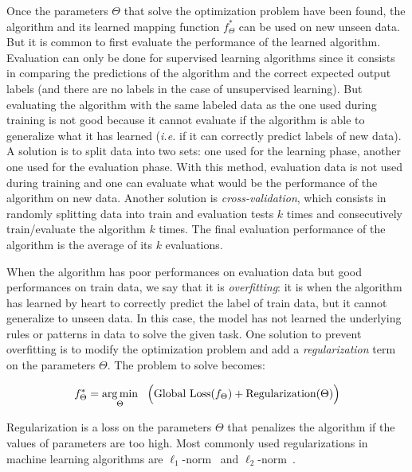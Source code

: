     Once the parameters $\Theta$ that solve the optimization problem have been
    found, the algorithm and its learned mapping function $f_{\Theta}^*$ can be
    used on new unseen data. But it is common to first evaluate the performance
    of the learned algorithm. Evaluation can only be done for supervised
    learning algorithms since it consists in comparing the predictions of the
    algorithm and the correct expected output labels (and there are no labels in
    the case of unsupervised learning). But evaluating the algorithm with the
    same labeled data as the one used during training is not good because it
    cannot evaluate if the algorithm is able to generalize what it has learned
    (\textit{i.e.} if it can correctly predict labels of new data). A solution
    is to split data into two sets: one used for the learning phase, another one
    used for the evaluation phase. With this method, evaluation data is not used
    during training and one can evaluate what would be the performance of the
    algorithm on new data. Another solution is \textit{cross-validation}, which
    consists in randomly splitting data into train and evaluation tests $k$
    times and consecutively train/evaluate the algorithm $k$ times. The final
    evaluation performance of the algorithm is the average of its $k$
    evaluations. \medskip

    When the algorithm has poor performances on evaluation data but good
    performances on train data, we say that it is \textit{overfitting}: it is
    when the algorithm has learned by heart to correctly predict the label of
    train data, but it cannot generalize to unseen data. In this case, the model
    has not learned the underlying rules or patterns in data to solve the given
    task. One solution to prevent overfitting is to modify the optimization
    problem and add a \textit{regularization} term on the parameters $\Theta$.
    The problem to solve becomes:

    \begin{equation}
      f_{\Theta}^* = \operatorname*{arg\,min}_{\Theta}~~\Big( \text{Global Loss} (f_\Theta) +
                     \text{Regularization} (\Theta) \Big)
    \end{equation}

    \noindent Regularization is a loss on the parameters $\Theta$ that penalizes
    the algorithm if the values of parameters are too high. Most commonly used
    regularizations in machine learning algorithms are
    $\ell_1$-norm~\citep{schmidt2005least} and
    $\ell_2$-norm~\citep{cortes2012l2}.

